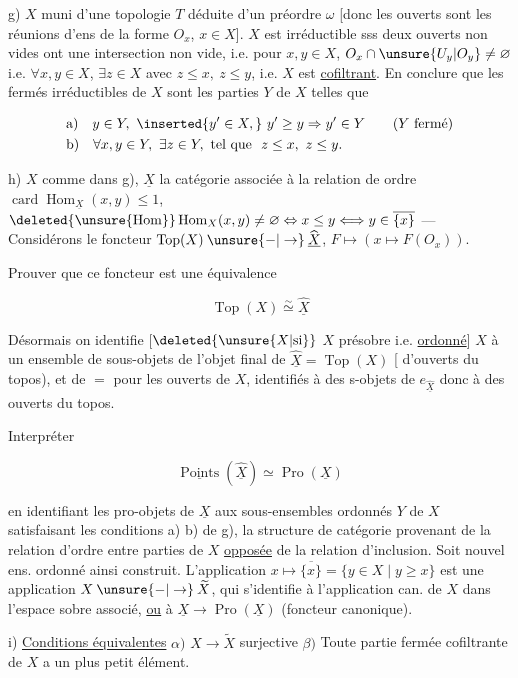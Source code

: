 g) $X$ muni d'une topologie $T$ déduite d'un préordre $\omega$ [donc les ouverts
sont les réunions d'ens de la forme $O_x$, $x\in X$]. $X$ est irréductible
sss deux ouverts non vides ont une intersection non vide, i.e. pour
$x,y\in X$, $O_x\cap\unsure{U_y|O_y}\ne\varnothing$ i.e. $\forall x,y\in X$, $\exists z\in X$ avec $z\leq x,\ z\leq y$,
i.e. $X$ est \uline{cofiltrant}. En conclure que les fermés irréductibles
de $X$ sont les parties $Y$ de $X$ telles que

\[
\begin{aligned}
&\text{a)}\quad y\in Y,\ \inserted{y'\in X,}\ y'\geq y\Rightarrow y'\in Y\qquad(Y\text{ fermé})\\
&\text{b)}\quad\forall x,y\in Y,\ \exists z\in Y,\ \text{tel que }\ z\leq x,\ z\leq y.
\end{aligned}
\]

h) $X$ comme dans g), $\underline X$ la catégorie associée à la relation de ordre
$\operatorname{card}\operatorname{Hom}_{\underline X}(x,y)\leq1$, $\deleted{\unsure{\mathrm{Hom}}}\operatorname{Hom}_{X}(x,y)\ne\varnothing\Leftrightarrow x\leq y\Longleftrightarrow y\in\overline{\{x\}}$ ---
Considérons le foncteur $\operatorname{Top}(X)\mathbin{\unsure{-|\to}}\widehat{\underline X}$, $F\longmapsto(x\longmapsto F(O_x))$.

Prouver que ce foncteur est une équivalence

\[
\operatorname{Top}(X)\mathrel{\overset{\sim}{\simeq}}\widehat{\underline X}
\]

Désormais on identifie [$\deleted{\unsure{X|\text{si}}}$ $X$ présobre i.e. \uline{ordonné}] $X$ à un
ensemble de sous-objets de l'objet final de $\widehat{\underline X}=\operatorname{Top}(X)$
[ d'ouverts du topos), et de $=$ pour les ouverts de $X$,
identifiés à des s-objets de $e_{\widehat{\underline X}}$ donc à des ouverts du topos.

Interpréter

\[
\underline{\operatorname{Points}}(\widehat{\underline X})\simeq\operatorname{Pro}(\underline X)
\]

en identifiant les pro-objets de $\underline X$  aux sous-ensembles
ordonnés $Y$ de $X$ satisfaisant les conditions a) b) de g),
 la structure de catégorie provenant de la relation
d'ordre entre parties de $X$ \uline{opposée} de la relation d'inclusion.
Soit  nouvel ens. ordonné ainsi construit. L'application
$x\longmapsto\overline{\{x\}}=\{y\in X\mid y\geq x\}$ est une application $X\mathbin{\unsure{-|\to}}\widetilde X$, qui
s'identifie à l'application can. de $X$ dans l'espace sobre
associé, \uline{ou} à $\underline X\longrightarrow\operatorname{Pro}(\underline X)$ (foncteur canonique).

i) \uline{Conditions équivalentes} $\alpha)$ $X\longrightarrow\widetilde X$ surjective
$\beta)$ Toute partie fermée cofiltrante de $X$ a un plus petit élément.
